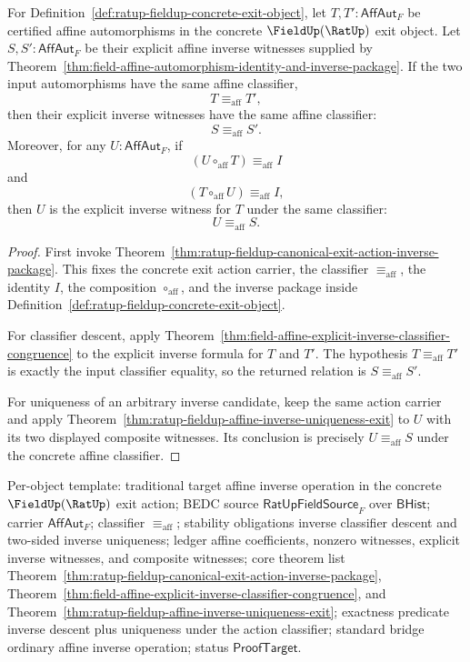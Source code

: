 \begin{theorem}
\label{thm:ratup-fieldup-canonical-affine-inverse-descent-and-uniqueness}
For Definition~\ref{def:ratup-fieldup-concrete-exit-object}, let
$T,T':\mathsf{AffAut}_F$ be certified affine automorphisms in the concrete
$\FieldUp(\RatUp)$ exit object. Let $S,S':\mathsf{AffAut}_F$ be their explicit
affine inverse witnesses supplied by
Theorem~\ref{thm:field-affine-automorphism-identity-and-inverse-package}. If
the two input automorphisms have the same affine classifier,
$$
T\equiv_{\mathrm{aff}}T',
$$
then their explicit inverse witnesses have the same affine classifier:
$$
S\equiv_{\mathrm{aff}}S'.
$$
Moreover, for any $U:\mathsf{AffAut}_F$, if
$$
(U\circ_{\mathrm{aff}}T)\equiv_{\mathrm{aff}} I
$$
and
$$
(T\circ_{\mathrm{aff}}U)\equiv_{\mathrm{aff}} I,
$$
then $U$ is the explicit inverse witness for $T$ under the same classifier:
$$
U\equiv_{\mathrm{aff}}S.
$$
\end{theorem}
\begin{proof}
First invoke
Theorem~\ref{thm:ratup-fieldup-canonical-exit-action-inverse-package}. This
fixes the concrete exit action carrier, the classifier
$\equiv_{\mathrm{aff}}$, the identity $I$, the composition
$\circ_{\mathrm{aff}}$, and the inverse package inside
Definition~\ref{def:ratup-fieldup-concrete-exit-object}.

For classifier descent, apply
Theorem~\ref{thm:field-affine-explicit-inverse-classifier-congruence} to the
explicit inverse formula for $T$ and $T'$. The hypothesis
$T\equiv_{\mathrm{aff}}T'$ is exactly the input classifier equality, so the
returned relation is $S\equiv_{\mathrm{aff}}S'$.

For uniqueness of an arbitrary inverse candidate, keep the same action carrier
and apply Theorem~\ref{thm:ratup-fieldup-affine-inverse-uniqueness-exit} to
$U$ with its two displayed composite witnesses. Its conclusion is precisely
$U\equiv_{\mathrm{aff}}S$ under the concrete affine classifier.
\end{proof}

Per-object template: traditional target affine inverse operation in the
concrete $\FieldUp(\RatUp)$ exit action; BEDC source
$\mathsf{RatUpFieldSource}_F$ over $\mathsf{BHist}$; carrier
$\mathsf{AffAut}_F$; classifier $\equiv_{\mathrm{aff}}$; stability obligations
inverse classifier descent and two-sided inverse uniqueness; ledger affine
coefficients, nonzero witnesses, explicit inverse witnesses, and composite
witnesses; core theorem list
Theorem~\ref{thm:ratup-fieldup-canonical-exit-action-inverse-package},
Theorem~\ref{thm:field-affine-explicit-inverse-classifier-congruence}, and
Theorem~\ref{thm:ratup-fieldup-affine-inverse-uniqueness-exit}; exactness
predicate inverse descent plus uniqueness under the action classifier; standard
bridge ordinary affine inverse operation; status $\mathsf{ProofTarget}$.

